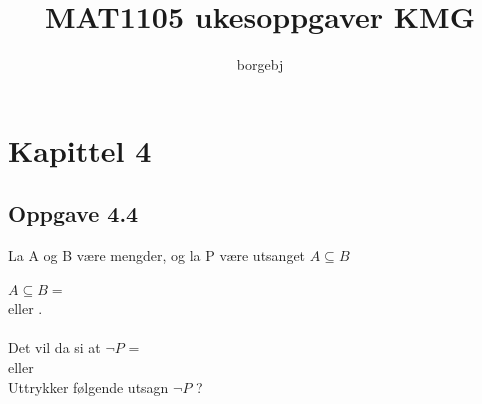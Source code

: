 \documentclass{article}
\title{MAT1105 ukesoppgaver KMG}
\author{borgebj}
\date{}
\begin{document}
\maketitle

\section*{Kapittel 4}
\subsection*{Oppgave 4.4}

La A og B være mengder, og la P være utsanget \(A \subseteq B\)

\( A \subseteq B = \) \\  eller . \\ \\
Det vil da si at \( \neg P \) = \\  eller  \\


Uttrykker følgende utsagn \(\neg P\) ?
\end{document}
